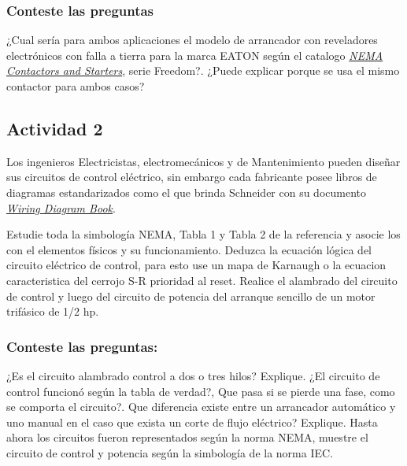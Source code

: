 \subsubsection{Conteste las preguntas}

¿Cual sería para ambos aplicaciones el modelo de arrancador con reveladores electrónicos con falla a tierra para la marca EATON según el catalogo \href{https://www.eaton.com/content/dam/eaton/products/industrialcontrols-drives-automation-sensors/nema-contactors-and-starters-v5-t2-ca08100006e.pdf}{\textit{NEMA Contactors and Starters}}, serie Freedom?. ¿Puede explicar porque se usa el mismo contactor para ambos casos?


\subsection{Actividad 2}
  Los ingenieros Electricistas, electromecánicos y de Mantenimiento pueden diseñar sus circuitos de control eléctrico, sin embargo cada fabricante posee libros de diagramas estandarizados como el que brinda  Schneider con su documento \href{https://download.schneider-electric.com/files?p_enDocType=Catalog&p_File_Name=0140CT9201.pdf&p_Doc_Ref=0140CT9201&_ga=2.160182845.1491407618.1677858387-1733391740.1677858387}{\textit{Wiring Diagram Book}}\cite{Scheneider2}.
 
 Estudie toda la simbología NEMA, Tabla 1 y Tabla 2 de la referencia \cite{Scheneider2} y asocie los con el elementos físicos y su funcionamiento.
 Deduzca la ecuación lógica del circuito eléctrico de control, para esto use un mapa de Karnaugh o la ecuacion caracteristica del cerrojo S-R prioridad al reset.
 Realice el alambrado del circuito de control y luego del circuito de potencia del arranque sencillo de un motor trifásico de 1/2 hp.
 
 
\subsubsection{Conteste las preguntas:}

¿Es el circuito alambrado control a dos o tres hilos? Explique. ¿El circuito de control funcionó según la tabla de verdad?, Que pasa si se pierde una fase, como se comporta el circuito?. Que diferencia existe entre un arrancador automático y uno manual en el caso que exista un corte de flujo eléctrico? Explique.
 Hasta ahora los circuitos fueron representados según la norma NEMA, muestre el circuito de control y potencia según la simbología de la norma IEC.

